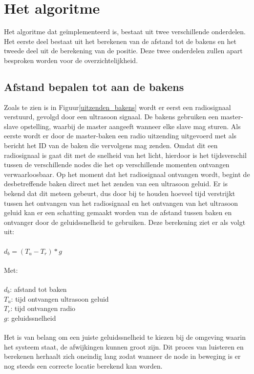 \documentclass{article}
\begin{document}
\section{Het algoritme}
Het algoritme dat ge\"{i}mplementeerd is, bestaat uit twee verschillende onderdelen. Het eerste deel bestaat uit het berekenen van de afstand tot de bakens en het tweede deel uit de berekening van de positie. Deze twee onderdelen zullen apart besproken worden voor de overzichtelijkheid.
	
\subsection{Afstand bepalen tot aan de bakens}
Zoals te zien is in Figuur\ref{uitzenden_bakens} wordt er eerst een radiosignaal verstuurd, gevolgd door een ultrasoon signaal. De bakens gebruiken een master-slave opstelling, waarbij de master aangeeft wanneer elke slave mag sturen. Als eerste wordt er door de master-baken een radio uitzending uitgevoerd met als bericht het ID van de baken die vervolgens mag zenden. Omdat dit een radiosignaal is gaat dit met de snelheid van het licht, hierdoor is het tijdsverschil tussen de verschillende nodes die het op verschillende momenten ontvangen verwaarloosbaar. Op het moment dat het radiosignaal ontvangen wordt, begint de desbetreffende baken direct met het zenden van een ultrasoon geluid. Er is bekend dat dit meteen gebeurt, dus door bij te houden hoeveel tijd verstrijkt tussen het ontvangen van het radiosignaal en het ontvangen van het ultrasoon geluid kan er een schatting gemaakt worden van de afstand tussen baken en ontvanger door de geluidssnelheid te gebruiken. Deze berekening ziet er als volgt uit:\\
\\
	\indent$ d_b = (T_u- T_r) * g $\\
	\\
	Met:\\
	\\
	\indent$ d_b$: afstand tot baken\\
	\indent$T_u$: tijd ontvangen ultrasoon geluid\\
	\indent$T_r$: tijd ontvangen radio\\
	\indent$g$: geluidssnelheid\\
\\
Het is van belang om een juiste geluidssnelheid te kiezen bij de omgeving waarin het systeem staat, de afwijkingen kunnen groot zijn. Dit proces van luisteren en berekenen herhaalt zich oneindig lang zodat wanneer de node in beweging is er nog steeds een correcte locatie berekend kan worden. 
	
\end{document}
